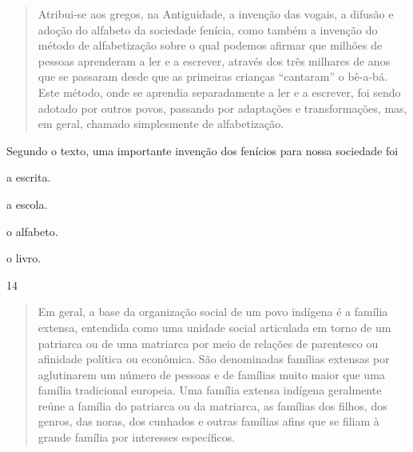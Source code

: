 \begin{quote}
Atribui-se aos gregos, na Antiguidade, a invenção das vogais, a
difusão e adoção do alfabeto da sociedade fenícia, como também a
invenção do método de alfabetização sobre o qual podemos afirmar que
milhões de pessoas aprenderam a ler e a escrever, através dos três
milhares de anos que se passaram desde que as primeiras crianças
“cantaram” o bê-a-bá. Este método, onde se aprendia separadamente a
ler e a escrever, foi sendo adotado por outros povos, passando por
adaptações e transformações, mas, em geral, chamado simplesmente de
alfabetização.

\end{quote}

\pagebreak
Segundo o texto, uma importante invenção dos fenícios para nossa sociedade foi

\begin{minipage}{.5\textwidth}
\begin{escolha}
\item a escrita.

\item a escola.

\item o alfabeto.

\item o livro.
\end{escolha}
\end{minipage}


\num{14}

\begin{quote}
Em geral, a base da organização social de um povo indígena é a
família extensa, entendida como uma unidade social articulada em torno
de um patriarca ou de uma matriarca por meio de relações de parentesco
ou afinidade política ou econômica. São denominadas famílias extensas
por aglutinarem um número de pessoas e de famílias muito maior que uma
família tradicional europeia. Uma família extensa indígena geralmente
reúne a família do patriarca ou da matriarca, as famílias dos filhos,
dos genros, das noras, dos cunhados e outras famílias afins que se
filiam à grande família por interesses específicos.

\end{quote}


